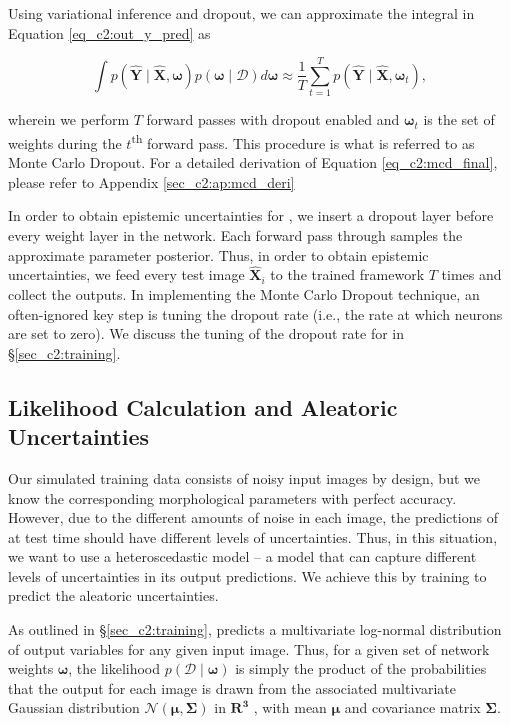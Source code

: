 Using variational inference and dropout, we can approximate the integral in Equation \ref{eq_c2:out_y_pred} as 

\begin{equation}
\int p(\boldsymbol{\hat{Y}} \mid \boldsymbol{\hat{X}}, \boldsymbol{\omega}) p(\boldsymbol{\omega} \mid \mathcal{D}) d \boldsymbol{\omega} \approx \frac{1}{T} \sum_{t=1}^{T} p(\boldsymbol{\hat{Y}} \mid \boldsymbol{\hat{X}}, \boldsymbol{\omega}_t) ,
\label{eq_c2:mcd_final}
\end{equation}

\noindent
wherein we perform $T$ forward passes with dropout enabled and $\boldsymbol{\omega}_t$ is the set of weights during the $t$\textsuperscript{th} forward pass. This procedure is what is referred to as Monte Carlo Dropout. For a detailed derivation of Equation \ref{eq_c2:mcd_final}, please refer to Appendix \ref{sec_c2:ap:mcd_deri}

In order to obtain epistemic uncertainties for \gampen{}, we insert a dropout layer before every weight layer in the network. Each forward pass through \gampen{} samples the approximate parameter posterior. Thus, in order to obtain epistemic uncertainties, we feed every test image $\boldsymbol{\hat{X}}_i$ to the trained \gampen{} framework $T$ times and collect the outputs. In implementing the Monte Carlo Dropout technique, an often-ignored key step is tuning the dropout rate (i.e., the rate at which neurons are set to zero). We discuss the tuning of the dropout rate for \gampen{} in \S \ref{sec_c2:training}.

\vspace{0.8cm}


\subsection{Likelihood Calculation and Aleatoric Uncertainties}
\label{subsec_c2:aleatoric}
Our simulated training data consists of noisy input images by design, but we know the corresponding morphological parameters with perfect accuracy. However, due to the different amounts of noise in each image, the predictions of \gampen{} at test time should have different levels of uncertainties. Thus, in this situation, we want to use a heteroscedastic model -- a model that can capture different levels of uncertainties in its output predictions. We achieve this by training \gampen{} to predict the aleatoric uncertainties. 

As outlined in \S \ref{sec_c2:training}, \gampen{} predicts a multivariate log-normal distribution of output variables for any given input image. Thus, for a given set of network weights $\boldsymbol{\omega}$, the likelihood $p(\mathcal{D} \mid \boldsymbol{\omega})$ is simply the product of the probabilities that the \gampen{} output for each image is drawn from the associated multivariate Gaussian distribution $\mathcal{N}(\boldsymbol{\mu}, \boldsymbol{\Sigma})$ in $\mathbf{R^3}$ , with mean $\boldsymbol{\mu}$ and covariance matrix $\boldsymbol{\Sigma}$.

